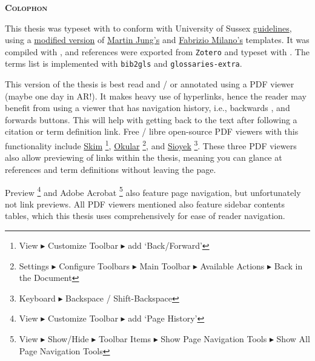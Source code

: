 {}

{}\label{sec: reading}
 \begin{flushleft}
	\Huge \textsc{\textbf{Colophon}}
	
\end{flushleft}
\begin{SingleSpace}
\noindent This thesis was typeset with  to conform with University of Sussex \href{https://www.sussex.ac.uk/rsao/examination}{guidelines}, using a \href{https://github.com/sambilbow/Sussex_PhDThesis}{modified version} of \href{https://github.com/Martin-Jung/Sussex_PhDThesis}{Martin Jung's} and \href{https://github.com/fabriziomiano/phd_thesis}{Fabrizio Milano's} templates. It was compiled with , and references were exported from \verb|Zotero| and typeset with . The terms list is implemented with \verb|bib2gls| and \verb|glossaries-extra|.

\noindent This version of the thesis is best read and / or annotated using a PDF viewer (maybe one day in AR!). It makes heavy use of hyperlinks, hence the reader may benefit from using a viewer that has navigation history, i.e., backwards \faArrowCircleLeft\space, and forwards \faArrowCircleRight\space buttons. This will help with getting back to the text after following a citation or term definition link. Free / libre open-source PDF viewers with this functionality include \href{https://sourceforge.net/projects/skim-app/}{Skim} \faApple\space \footnote{View $\blacktriangleright$ Customize Toolbar $\blacktriangleright$ add `Back/Forward'}, \href{https://okular.kde.org/en-gb/}{Okular} \faLinux \space \faWindows \space \footnote{Settings $\blacktriangleright$ Configure Toolbars  $\blacktriangleright$ Main Toolbar $\blacktriangleright$ Available Actions $\blacktriangleright$ Back in the Document}, and \href{https://sioyek.info/}{Sioyek} \faApple \space \faLinux \space \faWindows \space \footnote{Keyboard $\blacktriangleright$ Backspace / Shift-Backspace}. These three PDF viewers also allow previewing of links within the thesis, meaning you can glance at references and term definitions without leaving the page.

\noindent Preview \faApple\space \footnote{View $\blacktriangleright$ Customize Toolbar $\blacktriangleright$ add `Page History'} and Adobe Acrobat \faApple\space \faLinux \space \faWindows \space \footnote{View $\blacktriangleright$  Show/Hide $\blacktriangleright$ Toolbar Items $\blacktriangleright$ Show Page Navigation Tools $\blacktriangleright$ Show All Page Navigation Tools} also feature page navigation, but unfortunately not link previews. All PDF viewers mentioned also feature sidebar contents tables, which this thesis uses comprehensively for ease of reader navigation.


\end{SingleSpace}
